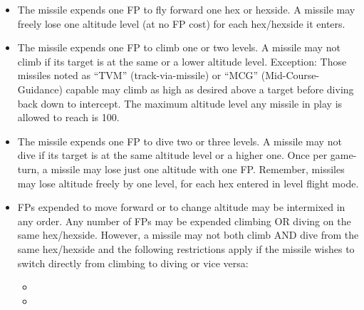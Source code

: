 \begin{itemize}

    \item {} The missile expends one FP to fly forward one hex or hexside. A missile may freely lose one altitude level (at no FP cost) for each hex/hexside it enters.

    \item {} The missile expends one FP to climb one or two levels. A missile may not climb if its target is at the same or a lower altitude level. Exception: Those missiles noted as “TVM” (track-via-missile) or “MCG” (Mid-Course-Guidance) capable may climb as high as desired above a target before diving back down to intercept. The maximum altitude level any missile in play is allowed to reach is 100.

    \item {} The missile expends one FP to dive two or three levels. A missile may not dive if its target is at the same altitude level or a higher one. Once per game-turn, a missile may lose just one altitude with one FP. Remember, missiles may lose altitude freely by one level, for each hex entered in level flight mode.

    \item {} FPs expended to move forward or to change altitude may be intermixed in any order. Any number of FPs may be expended climbing OR diving on the same hex/hexside. However, a missile may not both climb AND dive from the same hex/hexside and the following restrictions apply if the missile wishes to switch directly from climbing to diving or vice versa:

    \begin{itemize}

        \item {}
        
        \item {}


\end{itemize}
\end{itemize}
